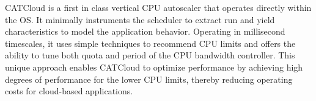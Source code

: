 CATCloud is a first in class vertical CPU autoscaler that operates directly within the OS. It minimally instruments the scheduler to extract run and yield characteristics to model the application behavior. Operating in millisecond timescales, it uses simple techniques to recommend CPU limits and offers the ability to tune both quota and period of the CPU bandwidth controller. This unique approach enables CATCloud to optimize performance by achieving high degrees of performance for the lower CPU limits, thereby reducing operating costs for cloud-based applications.